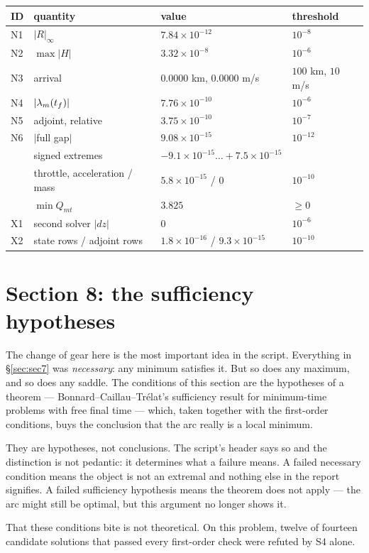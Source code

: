 \documentclass[11pt]{article}
\newcommand{\tf}{t_f}\newcommand{\R}{\mathbb{R}}
\newcommand{\Qmt}{Q_{mt}}
\begin{document}
\begin{ran}
\begin{tabular}{@{}llll@{}}
\toprule
ID & quantity & value & threshold \\
\midrule
N1 & $|R|_\infty$ & $7.84\times10^{-12}$ & $10^{-8}$ \\
N2 & $\max|H|$ & $3.32\times10^{-8}$ & $10^{-6}$ \\
N3 & arrival & $0.0000$ km, $0.0000$ m/s & $100$ km, $10$ m/s \\
N4 & $|\lm(\tf)|$ & $7.76\times10^{-10}$ & $10^{-6}$ \\
N5 & adjoint, relative & $3.75\times10^{-10}$ & $10^{-7}$ \\
N6 & $|$full gap$|$ & $9.08\times10^{-15}$ & $10^{-12}$ \\
   & signed extremes & $-9.1\times10^{-15} \ldots +7.5\times10^{-15}$ & \\
   & throttle, acceleration / mass & $5.8\times10^{-15}$ / $0$ & $10^{-10}$ \\
   & $\min \Qmt$ & $3.825$ & $\ge 0$ \\
X1 & second solver $|dz|$ & $0$ & $10^{-6}$ \\
X2 & state rows / adjoint rows & $1.8\times10^{-16}$ / $9.3\times10^{-15}$ & $10^{-10}$ \\
\bottomrule
\end{tabular}
\end{ran}

\section{Section 8: the sufficiency hypotheses}\label{sec:sec8}

\begin{intu}
The change of gear here is the most important idea in the script. Everything in
\S\ref{sec:sec7} was \emph{necessary}: any minimum satisfies it. But so does any
maximum, and so does any saddle. The conditions of this section are the
hypotheses of a theorem --- Bonnard--Caillau--Tr\'elat's sufficiency result for
minimum-time problems with free final time --- which, taken together with the
first-order conditions, buys the conclusion that the arc really is a local
minimum.

They are hypotheses, not conclusions. The script's header says so and the
distinction is not pedantic: it determines what a failure means. A failed
necessary condition means the object is not an extremal and nothing else in the
report signifies. A failed sufficiency hypothesis means the theorem does not
apply --- the arc might still be optimal, but this argument no longer shows it.

That these conditions bite is not theoretical. On this problem, twelve of
fourteen candidate solutions that passed every first-order check were refuted by
S4 alone.
\end{intu}
\end{document}

